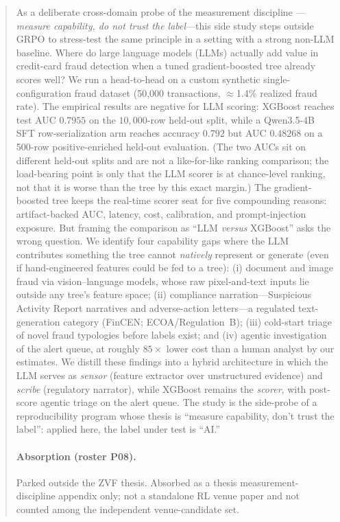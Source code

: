 \begin{abstract}
As a deliberate cross-domain probe of the \ours{} measurement discipline
---\emph{measure capability, do not trust the label}---this side study steps
outside GRPO to stress-test the same principle in a setting with a strong
non-LLM baseline. Where do large language models (LLMs) actually add value in
credit-card fraud detection when a tuned gradient-boosted tree already scores well? We run a
head-to-head on a custom synthetic single-configuration fraud dataset (50{,}000
transactions, $\approx$1.4\% realized fraud rate). The empirical results are negative for LLM scoring:
XGBoost reaches test AUC $0.7955$ on the $10{,}000$-row held-out split, while
a Qwen3.5-4B SFT row-serialization arm reaches accuracy $0.792$ but AUC
$0.48268$ on a 500-row positive-enriched held-out evaluation. (The two AUCs sit on
different held-out splits and are not a like-for-like ranking comparison; the
load-bearing point is only that the LLM scorer is at chance-level ranking, not that
it is worse than the tree by this exact margin.) The gradient-boosted tree keeps the real-time scorer seat for five compounding reasons:
artifact-backed AUC, latency, cost, calibration, and prompt-injection exposure.
But framing the comparison as
``LLM \emph{versus} XGBoost'' asks the wrong question. We identify four
capability gaps where the LLM contributes something the tree cannot \emph{natively}
represent or generate (even if hand-engineered features could be fed to a tree):
(i) document and image fraud via vision--language models, whose
raw pixel-and-text inputs lie outside any tree's feature space; (ii) compliance
narration---Suspicious Activity Report narratives and adverse-action
letters---a regulated text-generation category (FinCEN; ECOA/Regulation~B);
(iii) cold-start triage of novel fraud typologies before labels exist; and
(iv) agentic investigation of the alert queue, at roughly $85\times$ lower cost
than a human analyst by our estimates. We distill these findings into a
hybrid architecture in which the LLM serves as \emph{sensor} (feature extractor
over unstructured evidence) and \emph{scribe} (regulatory narrator), while
XGBoost remains the \emph{scorer}, with post-score agentic triage on the alert
queue. The study is the side-probe of a reproducibility program whose thesis is
``measure capability, don't trust the label'': applied here, the label under
test is ``AI.''
\paragraph{Absorption (roster P08).}
Parked outside the ZVF thesis. Absorbed as a thesis measurement-discipline
appendix only; not a standalone RL venue paper and not counted among the
independent venue-candidate set.
\end{abstract}
